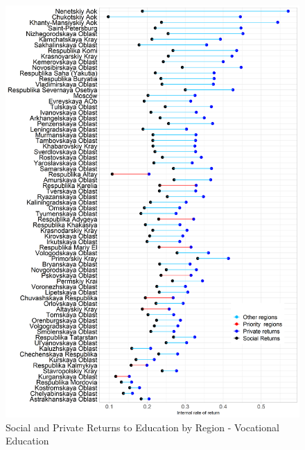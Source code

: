 \documentclass[alpha-refs]{wiley-article-05g}
\begin{document}
\begin{center}
	\begin{figure}[htbp!]
\begin{minipage}[b]{1\linewidth}
			\centering
			\includegraphics[scale=0.55]{returns_by_region_plot2.png}
		\end{minipage}
			\caption{Social and Private Returns to Education by Region - 
			Vocational Education}\label{fig:1.3}
	\end{figure}


\end{center}
\end{document}
